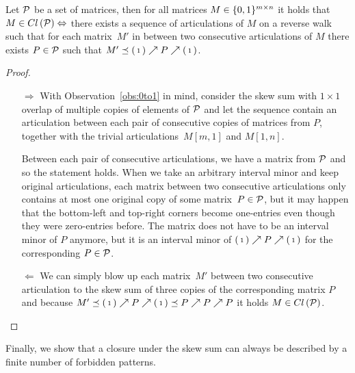 \begin{lemma}
\label{lemma:artic}
Let $\mathcal{P}$ be a set of matrices, then for all matrices $M\in\{0,1\}^{m\times n}$ it holds that $M\in Cl\left(\mathcal{P}\right)\Leftrightarrow$ there exists a sequence of articulations of $M$ on a reverse walk such that for each matrix~$M'$ in between two consecutive articulations of $M$ there exists $P\in\mathcal{P}$ such that $M'\preceq\left(\begin{smallmatrix}1\end{smallmatrix}\right)\nearrow P\nearrow\left(\begin{smallmatrix}1\end{smallmatrix}\right)$.
\end{lemma}
\begin{proof}
\begin{itemize}
	\item[$\Rightarrow$] With Observation~\ref{obs:0to1} in mind, consider the skew sum with $1\times1$ overlap of multiple copies of elements of $\mathcal{P}$ and let the sequence contain an articulation between each pair of consecutive copies of matrices from $P$, together with the trivial articulations~$M[m,1]$ and $M[1,n]$.
	
	Between each pair of consecutive articulations, we have a matrix from $\mathcal{P}$ and so the statement holds. When we take an arbitrary interval minor and keep original articulations, each matrix between two consecutive articulations only contains at most one original copy of some matrix~$P\in\mathcal{P}$, but it may happen that the bottom-left and top-right corners become one-entries even though they were zero-entries before. The matrix does not have to be an interval minor of $P$ anymore, but it is an interval minor of $\left(\begin{smallmatrix}1\end{smallmatrix}\right)\nearrow P\nearrow\left(\begin{smallmatrix}1\end{smallmatrix}\right)$ for the corresponding $P\in\mathcal{P}$.
	\item[$\Leftarrow$] We can simply blow up each matrix~$M'$ between two consecutive articulation to the skew sum of three copies of the corresponding matrix $P$ and because $M'\preceq\left(\begin{smallmatrix}1\end{smallmatrix}\right)\nearrow P\nearrow\left(\begin{smallmatrix}1\end{smallmatrix}\right)\preceq P\nearrow P\nearrow P$ it holds $M\in Cl\left(\mathcal{P}\right)$.
\end{itemize}
\end{proof}

Finally, we show that a closure under the skew sum can always be described by a finite number of forbidden patterns.


